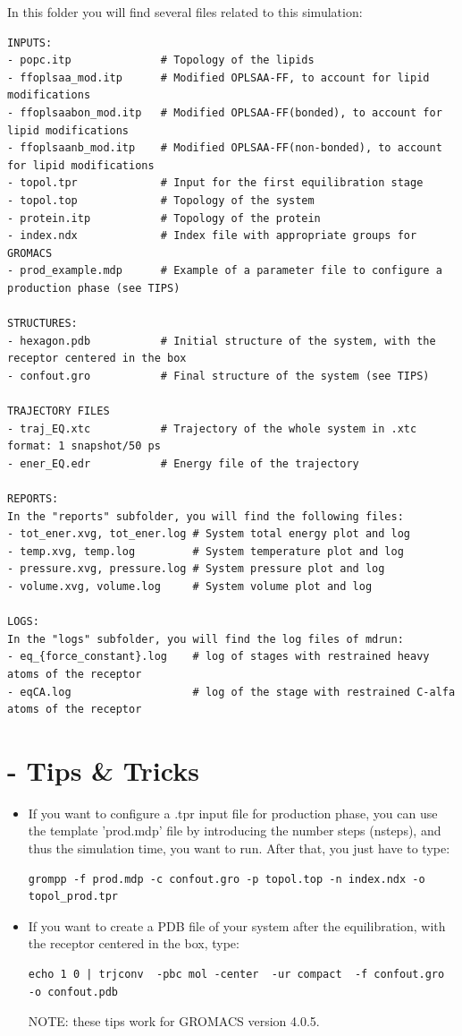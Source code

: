 \documentclass[10pt, oneside, pdftex]{article}
\begin{document}
In this folder you will find several files related to this simulation:

\begin{Verbatim}
INPUTS:
- popc.itp              # Topology of the lipids
- ffoplsaa_mod.itp      # Modified OPLSAA-FF, to account for lipid modifications
- ffoplsaabon_mod.itp   # Modified OPLSAA-FF(bonded), to account for lipid modifications
- ffoplsaanb_mod.itp    # Modified OPLSAA-FF(non-bonded), to account for lipid modifications
- topol.tpr             # Input for the first equilibration stage
- topol.top             # Topology of the system
- protein.itp           # Topology of the protein
- index.ndx             # Index file with appropriate groups for GROMACS
- prod_example.mdp      # Example of a parameter file to configure a production phase (see TIPS)

STRUCTURES:
- hexagon.pdb           # Initial structure of the system, with the receptor centered in the box
- confout.gro           # Final structure of the system (see TIPS)

TRAJECTORY FILES
- traj_EQ.xtc           # Trajectory of the whole system in .xtc format: 1 snapshot/50 ps        
- ener_EQ.edr           # Energy file of the trajectory

REPORTS:
In the "reports" subfolder, you will find the following files:
- tot_ener.xvg, tot_ener.log # System total energy plot and log
- temp.xvg, temp.log         # System temperature plot and log
- pressure.xvg, pressure.log # System pressure plot and log
- volume.xvg, volume.log     # System volume plot and log

LOGS:
In the "logs" subfolder, you will find the log files of mdrun:
- eq_{force_constant}.log    # log of stages with restrained heavy atoms of the receptor
- eqCA.log                   # log of the stage with restrained C-alfa atoms of the receptor
\end{Verbatim}

\section*{ - Tips \& Tricks}
\begin{itemize}
\item{If you want to configure a .tpr input file for production phase, you
can use the  template 'prod.mdp' file by introducing  the number steps
(nsteps), and thus  the simulation time, you want  to run. After that,
you just have to type:
\begin{Verbatim}
grompp -f prod.mdp -c confout.gro -p topol.top -n index.ndx -o topol_prod.tpr
\end{Verbatim}
}

\item{If  you  want  to  create  a  PDB file  of  your  system  after  the
equilibration, with the receptor centered in the box, type: 
\begin{Verbatim}
echo 1 0 | trjconv  -pbc mol -center  -ur compact  -f confout.gro  -o confout.pdb
\end{Verbatim}
NOTE: these tips work for GROMACS version 4.0.5.}
\end{itemize}
\end{document}
